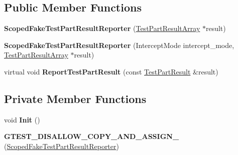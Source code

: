 \subsection*{Public Member Functions}
\begin{DoxyCompactItemize}
\item 
\mbox{\label{classtesting_1_1_scoped_fake_test_part_result_reporter_aa0100ecf4799fb51d45167be6a5de1d5}} 
{\bfseries Scoped\+Fake\+Test\+Part\+Result\+Reporter} (\hyperlink{classtesting_1_1_test_part_result_array}{Test\+Part\+Result\+Array} $\ast$result)
\item 
\mbox{\label{classtesting_1_1_scoped_fake_test_part_result_reporter_a57cbc09ed48627c8a73e622618dc4b4f}} 
{\bfseries Scoped\+Fake\+Test\+Part\+Result\+Reporter} (Intercept\+Mode intercept\+\_\+mode, \hyperlink{classtesting_1_1_test_part_result_array}{Test\+Part\+Result\+Array} $\ast$result)
\item 
\mbox{\label{classtesting_1_1_scoped_fake_test_part_result_reporter_a3bc6cb939cbc3db71ece8846e6bafe00}} 
virtual void {\bfseries Report\+Test\+Part\+Result} (const \hyperlink{classtesting_1_1_test_part_result}{Test\+Part\+Result} \&result)
\end{DoxyCompactItemize}
\subsection*{Private Member Functions}
\begin{DoxyCompactItemize}
\item 
\mbox{\label{classtesting_1_1_scoped_fake_test_part_result_reporter_a28d280a3f5d172d63b94f70b8e7660d7}} 
void {\bfseries Init} ()
\item 
\mbox{\label{classtesting_1_1_scoped_fake_test_part_result_reporter_ad7d21ddf4a50ff918571e8a08e73fd59}} 
{\bfseries G\+T\+E\+S\+T\+\_\+\+D\+I\+S\+A\+L\+L\+O\+W\+\_\+\+C\+O\+P\+Y\+\_\+\+A\+N\+D\+\_\+\+A\+S\+S\+I\+G\+N\+\_\+} (\hyperlink{classtesting_1_1_scoped_fake_test_part_result_reporter}{Scoped\+Fake\+Test\+Part\+Result\+Reporter})
\end{DoxyCompactItemize}
